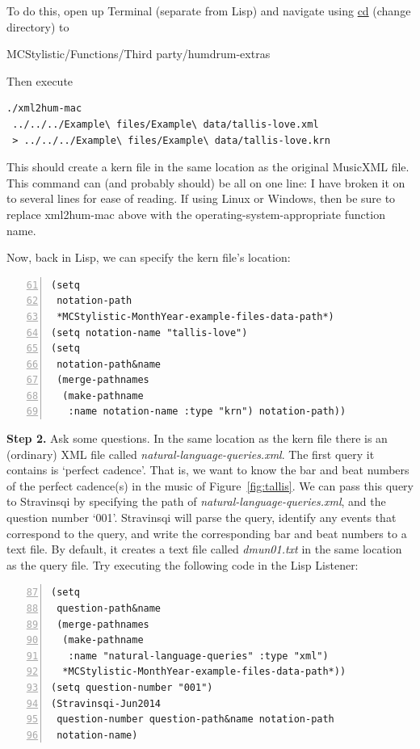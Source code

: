 To do this, open up Terminal (separate from Lisp)
and navigate using \href{http://en.wikipedia.org/wiki/Cd_\%28command\%29}{cd}
(change directory) to

\vspace{.25cm}
\noindent MCStylistic/Functions/Third party/humdrum-extras
\vspace{.25cm}

\noindent Then execute
\begin{verbatim}
./xml2hum-mac
 ../../../Example\ files/Example\ data/tallis-love.xml
 > ../../../Example\ files/Example\ data/tallis-love.krn
\end{verbatim}

\noindent This should create a kern file in the same
location as the original MusicXML file. This command
can (and probably should) be all on one line: I have
broken it on to several lines for ease of reading. If
using Linux or Windows, then be sure to replace
xml2hum-mac above with the
operating-system-appropriate function name.

Now, back in Lisp, we can specify the kern file's
location:

\begin{Verbatim}[frame=single,numbers=left,firstnumber=61]
(setq
 notation-path
 *MCStylistic-MonthYear-example-files-data-path*)
(setq notation-name "tallis-love")
(setq
 notation-path&name
 (merge-pathnames
  (make-pathname
   :name notation-name :type "krn") notation-path))
\end{Verbatim}

\textbf{Step 2.} Ask some questions. In the same
location as the kern file there is an (ordinary) XML
file called \emph{natural-language-queries.xml}. The
first query it contains is `perfect cadence'. That is,
we want to know the bar and beat numbers of the
perfect cadence(s) in the music of
Figure~\ref{fig:tallis}. We can pass this query to
Stravinsqi by specifying the path of
\emph{natural-language-queries.xml}, and the question
number `001'. Stravinsqi will parse the query,
identify any events that correspond to the query, and
write the corresponding bar and beat numbers to a text
file. By default, it creates a text file called
\emph{dmun01.txt} in the same location as the query
file. Try executing the following code in the Lisp
Listener:

\begin{Verbatim}[frame=single,numbers=left,firstnumber=87]
(setq
 question-path&name
 (merge-pathnames
  (make-pathname
   :name "natural-language-queries" :type "xml")
  *MCStylistic-MonthYear-example-files-data-path*))
(setq question-number "001")
(Stravinsqi-Jun2014
 question-number question-path&name notation-path
 notation-name)
\end{Verbatim}

